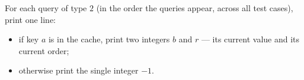 For each query of type $2$ (in the order the queries appear, across all test cases), print one line:

\begin{itemize}
  \item if key $a$ is in the cache, print two integers $b$ and $r$ --- its current value and its current order;
  \item otherwise print the single integer $-1$.
\end{itemize}
